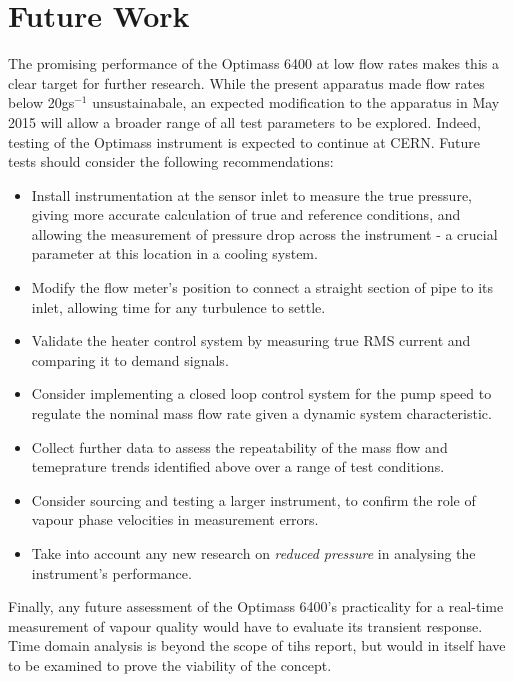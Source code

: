\documentclass{report}
\begin{document}
\chapter{Future Work} \label{further research}
The promising performance of the Optimass 6400 at low flow rates makes this a clear target for further research. While the present apparatus made flow rates below 20gs$^{-1}$ unsustainabale, an expected modification to the apparatus in May 2015 will allow a broader range of all test parameters to be explored. Indeed, testing of the Optimass instrument is expected to continue at CERN. Future tests should consider the following recommendations:
\begin{itemize}
\item{Install instrumentation at the sensor inlet to measure the true pressure, giving more accurate calculation of true and reference conditions, and allowing the measurement of pressure drop across the instrument - a crucial parameter at this location in a cooling system.}
\item{Modify the flow meter's position to connect a straight section of pipe to its inlet, allowing time for any turbulence to settle.}
\item{Validate the heater control system by measuring true RMS current and comparing it to demand signals.}
\item{Consider implementing a closed loop control system for the pump speed to regulate the nominal mass flow rate given a dynamic system characteristic.}
\item{Collect further data to assess the repeatability of the mass flow and temeprature trends identified above over a range of test conditions.}
\item{Consider sourcing and testing a larger instrument, to confirm the role of vapour phase velocities in measurement errors.}
\item{Take into account any new research on \textit{reduced pressure} in analysing the instrument's performance.}
\end{itemize}
Finally, any future assessment of the Optimass 6400's practicality for a real-time measurement of vapour quality would have to evaluate its transient response. Time domain analysis is beyond the scope of tihs report, but would in itself have to be examined to prove the viability of the concept.
\end{document}
